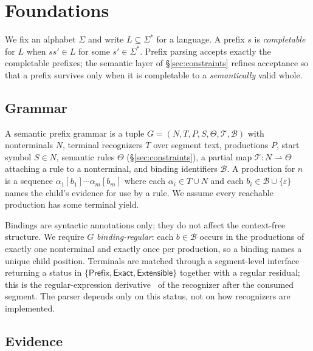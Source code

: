\section{Foundations}
\label{sec:foundations}

We fix an alphabet $\Sigma$ and write $L \subseteq \Sigma^\ast$ for a language. A
prefix $s$ is \emph{completable} for $L$ when $s s' \in L$ for some
$s' \in \Sigma^\ast$. Prefix parsing accepts exactly the completable prefixes;
the semantic layer of \S\ref{sec:constraints} refines acceptance so that a prefix
survives only when it is completable to a \emph{semantically} valid whole.

\subsection{Grammar}
\label{sec:grammar}

\begin{definition}
  \label{def:spg}
  A semantic prefix grammar is a tuple $G = (N, T, P, S, \Theta, \mathcal{T},
  \mathcal{B})$ with nonterminals $N$, terminal recognizers $T$ over segment
  text, productions $P$, start symbol $S \in N$, semantic rules $\Theta$
  (\S\ref{sec:constraints}), a partial map $\mathcal{T} : N \rightharpoonup
  \Theta$ attaching a rule to a nonterminal, and binding identifiers
  $\mathcal{B}$. A production for $n$ is a sequence
  $\alpha_1[b_1]\cdots\alpha_m[b_m]$ where each $\alpha_i \in T \cup N$ and each
  $b_i \in \mathcal{B} \cup \{\varepsilon\}$ names the child's evidence for use
  by a rule. We assume every reachable production has some terminal yield.
\end{definition}

Bindings are syntactic annotations only; they do not affect the context-free
structure. We require $G$ \emph{binding-regular}: each $b \in \mathcal{B}$ occurs
in the productions of exactly one nonterminal and exactly once per production, so
a binding names a unique child position. Terminals are matched through a
segment-level interface returning a status in $\{\mathsf{Prefix},
\mathsf{Exact}, \mathsf{Extensible}\}$ together with a regular residual; this is
the regular-expression derivative~\cite{brzozowski1964derivatives,owens2009regex}
of the recognizer after the consumed segment. The parser depends only on this
status, not on how recognizers are implemented.

\subsection{Evidence}
\label{sec:evidence}

